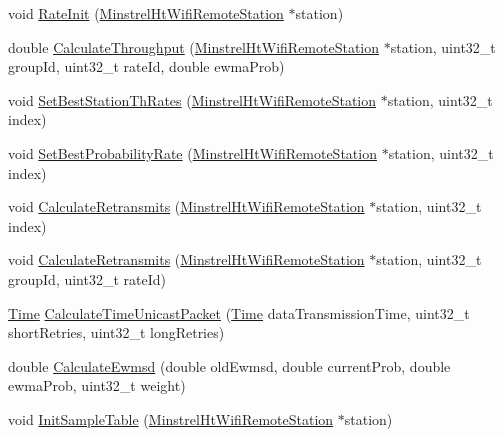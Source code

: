 \begin{DoxyCompactItemize}
\item 
void \hyperlink{classns3_1_1MinstrelHtWifiManager_a3b59b889db624539c6d5af89fa5e9f74}{Rate\+Init} (\hyperlink{structns3_1_1MinstrelHtWifiRemoteStation}{Minstrel\+Ht\+Wifi\+Remote\+Station} $\ast$station)
\item 
double \hyperlink{classns3_1_1MinstrelHtWifiManager_aedf901def4f23eac093a7da8f363170b}{Calculate\+Throughput} (\hyperlink{structns3_1_1MinstrelHtWifiRemoteStation}{Minstrel\+Ht\+Wifi\+Remote\+Station} $\ast$station, uint32\+\_\+t group\+Id, uint32\+\_\+t rate\+Id, double ewma\+Prob)
\item 
void \hyperlink{classns3_1_1MinstrelHtWifiManager_a5c8fb23ad34518c1e1f2add75a3b7f4c}{Set\+Best\+Station\+Th\+Rates} (\hyperlink{structns3_1_1MinstrelHtWifiRemoteStation}{Minstrel\+Ht\+Wifi\+Remote\+Station} $\ast$station, uint32\+\_\+t index)
\item 
void \hyperlink{classns3_1_1MinstrelHtWifiManager_ac9995672834a1256d4203b6045f6b513}{Set\+Best\+Probability\+Rate} (\hyperlink{structns3_1_1MinstrelHtWifiRemoteStation}{Minstrel\+Ht\+Wifi\+Remote\+Station} $\ast$station, uint32\+\_\+t index)
\item 
void \hyperlink{classns3_1_1MinstrelHtWifiManager_a01ece0b82fd4cefb27de6a8759bc9529}{Calculate\+Retransmits} (\hyperlink{structns3_1_1MinstrelHtWifiRemoteStation}{Minstrel\+Ht\+Wifi\+Remote\+Station} $\ast$station, uint32\+\_\+t index)
\item 
void \hyperlink{classns3_1_1MinstrelHtWifiManager_a5d5a52477371def6807f70167144372c}{Calculate\+Retransmits} (\hyperlink{structns3_1_1MinstrelHtWifiRemoteStation}{Minstrel\+Ht\+Wifi\+Remote\+Station} $\ast$station, uint32\+\_\+t group\+Id, uint32\+\_\+t rate\+Id)
\item 
\hyperlink{classns3_1_1Time}{Time} \hyperlink{classns3_1_1MinstrelHtWifiManager_a1ec0bac59759a6cb084d5f12149bac19}{Calculate\+Time\+Unicast\+Packet} (\hyperlink{classns3_1_1Time}{Time} data\+Transmission\+Time, uint32\+\_\+t short\+Retries, uint32\+\_\+t long\+Retries)
\item 
double \hyperlink{classns3_1_1MinstrelHtWifiManager_a68fa27a1e0e083f4d3f2e19db64c1d4e}{Calculate\+Ewmsd} (double old\+Ewmsd, double current\+Prob, double ewma\+Prob, uint32\+\_\+t weight)
\item 
void \hyperlink{classns3_1_1MinstrelHtWifiManager_a073d213169fe62c797ceb92ad999dcb0}{Init\+Sample\+Table} (\hyperlink{structns3_1_1MinstrelHtWifiRemoteStation}{Minstrel\+Ht\+Wifi\+Remote\+Station} $\ast$station)
\item 

\end{DoxyCompactItemize}

